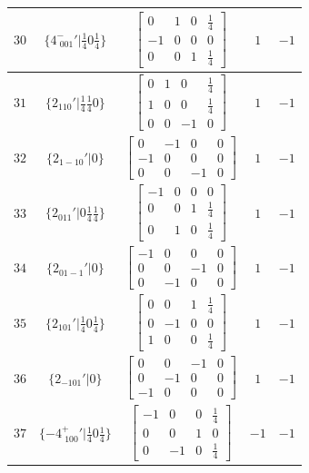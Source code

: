 \documentclass[fleqn,8pt]{jsarticle}
\begin{document}
\begin{longtable}{ccccc}
$ 30 $ & $ \{4^{-}_{\,\,001}{}'|\frac{1}{4} 0 \frac{1}{4}\} $ & $ \begin{bmatrix} 0 & 1 & 0 & \frac{1}{4} \\ -1 & 0 & 0 & 0 \\ 0 & 0 & 1 & \frac{1}{4} \end{bmatrix} $ & $ 1 $ & $ -1 $ \\ \hline
$ 31 $ & $ \{2{}_{110}{}'|\frac{1}{4} \frac{1}{4} 0\} $ & $ \begin{bmatrix} 0 & 1 & 0 & \frac{1}{4} \\ 1 & 0 & 0 & \frac{1}{4} \\ 0 & 0 & -1 & 0 \end{bmatrix} $ & $ 1 $ & $ -1 $ \\ \hline
$ 32 $ & $ \{2{}_{1-10}{}'|0\} $ & $ \begin{bmatrix} 0 & -1 & 0 & 0 \\ -1 & 0 & 0 & 0 \\ 0 & 0 & -1 & 0 \end{bmatrix} $ & $ 1 $ & $ -1 $ \\ \hline
$ 33 $ & $ \{2{}_{011}{}'|0 \frac{1}{4} \frac{1}{4}\} $ & $ \begin{bmatrix} -1 & 0 & 0 & 0 \\ 0 & 0 & 1 & \frac{1}{4} \\ 0 & 1 & 0 & \frac{1}{4} \end{bmatrix} $ & $ 1 $ & $ -1 $ \\ \hline
$ 34 $ & $ \{2{}_{01-1}{}'|0\} $ & $ \begin{bmatrix} -1 & 0 & 0 & 0 \\ 0 & 0 & -1 & 0 \\ 0 & -1 & 0 & 0 \end{bmatrix} $ & $ 1 $ & $ -1 $ \\ \hline
$ 35 $ & $ \{2{}_{101}{}'|\frac{1}{4} 0 \frac{1}{4}\} $ & $ \begin{bmatrix} 0 & 0 & 1 & \frac{1}{4} \\ 0 & -1 & 0 & 0 \\ 1 & 0 & 0 & \frac{1}{4} \end{bmatrix} $ & $ 1 $ & $ -1 $ \\ \hline
$ 36 $ & $ \{2{}_{-101}{}'|0\} $ & $ \begin{bmatrix} 0 & 0 & -1 & 0 \\ 0 & -1 & 0 & 0 \\ -1 & 0 & 0 & 0 \end{bmatrix} $ & $ 1 $ & $ -1 $ \\ \hline
$ 37 $ & $ \{-4^{+}_{\,\,100}{}'|\frac{1}{4} 0 \frac{1}{4}\} $ & $ \begin{bmatrix} -1 & 0 & 0 & \frac{1}{4} \\ 0 & 0 & 1 & 0 \\ 0 & -1 & 0 & \frac{1}{4} \end{bmatrix} $ & $ -1 $ & $ -1 $ \\ \hline

\end{longtable}
\end{document}

